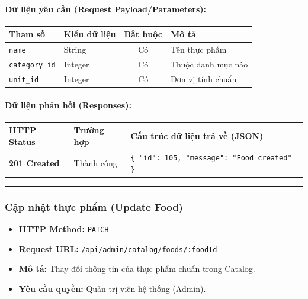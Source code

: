 \documentclass[12pt,a4paper]{article}
\begin{document}
\paragraph{Dữ liệu yêu cầu (Request Payload/Parameters):}
\begin{longtable}{|>{\raggedright\arraybackslash}p{2.8cm}|>{\raggedright\arraybackslash}p{2.2cm}|c|>{\raggedright\arraybackslash}p{7.0cm}|}
\hline
\textbf{Tham số} & \textbf{Kiểu dữ liệu} & \textbf{Bắt buộc} & \textbf{Mô tả} \\ \hline
\endhead
\texttt{name} & String & Có & Tên thực phẩm \\ \hline
\texttt{category\_id} & Integer & Có & Thuộc danh mục nào \\ \hline
\texttt{unit\_id} & Integer & Có & Đơn vị tính chuẩn \\ \hline
\end{longtable}

\paragraph{Dữ liệu phản hồi (Responses):}
\begin{longtable}{|>{\raggedright\arraybackslash}p{2.8cm}|>{\raggedright\arraybackslash}p{3.2cm}|>{\raggedright\arraybackslash}p{8.0cm}|}
\hline
\textbf{HTTP Status} & \textbf{Trường hợp} & \textbf{Cấu trúc dữ liệu trả về (JSON)} \\ \hline
\endhead
\textbf{201 Created} & Thành công & \texttt{\{ "id": 105, "message": "Food created" \}} \\ \hline
\end{longtable}

\vskip 0.4cm
\noindent\rule{\textwidth}{0.3pt}
\vskip 0.4cm

\subsubsection{Cập nhật thực phẩm (Update Food)}
\begin{itemize}[leftmargin=*]
    \item \textbf{HTTP Method:} \texttt{PATCH}
    \item \textbf{Request URL:} \texttt{/api/admin/catalog/foods/:foodId}
    \item \textbf{Mô tả:} Thay đổi thông tin của thực phẩm chuẩn trong Catalog.
    \item \textbf{Yêu cầu quyền:} Quản trị viên hệ thống (Admin).
\end{itemize}
\end{document}
